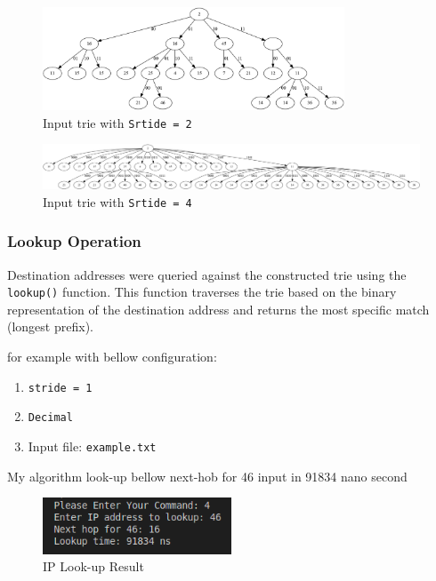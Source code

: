 \documentclass[12pt	]{article}
\begin{document}
\begin{figure}[h!]
	\centering
	\includegraphics[width=0.8\textwidth]{Images/img7.png}
	\caption{Input trie with \texttt{Srtide = 2}}
	\label{fig:Input trie with Srtide = 2}
\end{figure}


\begin{figure}[h!]
	\centering
	\includegraphics[width=1\textwidth]{Images/img8.png}
	\caption{Input trie with \texttt{Srtide = 4}}
	\label{fig:Input trie with Srtide = 4}
\end{figure}
\newpage





\subsubsection{Lookup Operation}
Destination addresses were queried against the constructed trie using the \texttt{lookup()} function. This function traverses the trie based on the binary representation of the destination address and returns the most specific match (longest prefix).

for example with bellow configuration:
\begin{enumerate}
	\item \texttt{stride = 1}
	\item \texttt{Decimal}
	\item Input file: \texttt{example.txt}
\end{enumerate}

My algorithm look-up bellow next-hob for 46 input in 91834 nano second

\begin{figure}[h!]
	\centering
	\includegraphics[width=0.5\textwidth]{Images/img9.png}
	\caption{IP Look-up Result}
	\label{fig:IP Look-up Result}
\end{figure}
\end{document}
